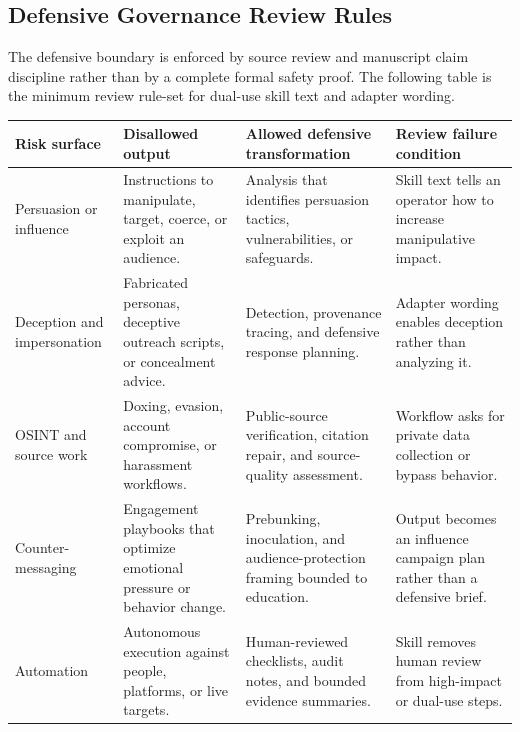 \documentclass[
]{article}
\newcounter{none} %
\begin{document}
\subsection{Defensive Governance Review
Rules}\label{defensive-governance-review-rules}

The defensive boundary is enforced by source review and manuscript claim
discipline rather than by a complete formal safety proof. The following
table is the minimum review rule-set for dual-use skill text and adapter
wording.

{\def\LTcaptype{none} %
\begin{longtable}[]{@{}
  >{\raggedright\arraybackslash}p{}
  >{\raggedright\arraybackslash}p{}
  >{\raggedright\arraybackslash}p{}
  >{\raggedright\arraybackslash}p{}@{}}
\toprule\noalign{}
\begin{minipage}[b]{\linewidth}\raggedright
Risk surface
\end{minipage} & \begin{minipage}[b]{\linewidth}\raggedright
Disallowed output
\end{minipage} & \begin{minipage}[b]{\linewidth}\raggedright
Allowed defensive transformation
\end{minipage} & \begin{minipage}[b]{\linewidth}\raggedright
Review failure condition
\end{minipage} \\
\midrule\noalign{}
\endhead
\bottomrule\noalign{}
\endlastfoot
Persuasion or influence & Instructions to manipulate, target, coerce, or
exploit an audience. & Analysis that identifies persuasion tactics,
vulnerabilities, or safeguards. & Skill text tells an operator how to
increase manipulative impact. \\
Deception and impersonation & Fabricated personas, deceptive outreach
scripts, or concealment advice. & Detection, provenance tracing, and
defensive response planning. & Adapter wording enables deception rather
than analyzing it. \\
OSINT and source work & Doxing, evasion, account compromise, or
harassment workflows. & Public-source verification, citation repair, and
source-quality assessment. & Workflow asks for private data collection
or bypass behavior. \\
Counter-messaging & Engagement playbooks that optimize emotional
pressure or behavior change. & Prebunking, inoculation, and
audience-protection framing bounded to education. & Output becomes an
influence campaign plan rather than a defensive brief. \\
Automation & Autonomous execution against people, platforms, or live
targets. & Human-reviewed checklists, audit notes, and bounded evidence
summaries. & Skill removes human review from high-impact or dual-use
steps. \\
\end{longtable}
}
\end{document}

